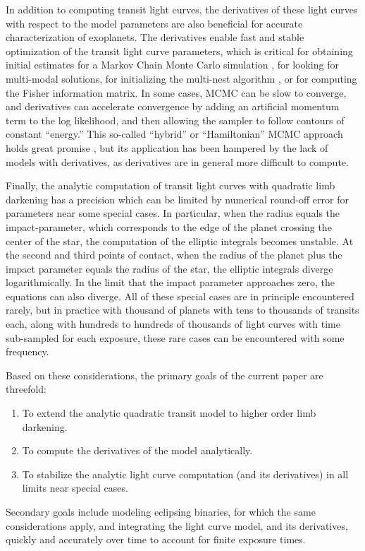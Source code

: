 \documentclass[modern,trackchanges]{aastex63}
\begin{document}
In addition to computing transit light curves, the derivatives of these light
curves with respect to the model parameters are also beneficial for accurate
characterization of exoplanets.   The derivatives enable fast and stable
optimization of the transit light curve parameters, which is critical for
obtaining initial estimates for a Markov Chain Monte Carlo simulation
\citep[MCMC; e.g.][]{Ford2005,Ford2006},
for looking for multi-modal solutions, for initializing the multi-nest
algorithm \citep{Feroz2008}, or for computing the Fisher information matrix.
In some cases, MCMC can be slow to converge, and derivatives can accelerate
convergence by adding an artificial momentum term to the log likelihood,
and then allowing the sampler to follow contours of constant ``energy.''
This so-called ``hybrid'' or ``Hamiltonian'' MCMC approach holds great promise \citep{Neal2011,Girolami2011,Betancourt2017},
but its application has been hampered by the lack of models with derivatives,
as derivatives are in general more difficult to compute.

Finally, the analytic computation of transit light curves with quadratic
limb darkening has a precision which can be limited by numerical round-off
error for parameters near some special cases.  In
particular, when the radius equals the impact-parameter, which corresponds to
the edge of the planet crossing the center of the star, the computation of the
elliptic integrals becomes unstable.  At the second and third points of
contact, when the radius of the planet plus the impact parameter equals
the radius of the star, the elliptic integrals diverge logarithmically.  In the
limit that the impact parameter approaches zero, the equations can also
diverge.  All of these special cases are in principle encountered rarely,
but in practice with thousand of planets with tens to thousands of
transits each, along with hundreds to hundreds of thousands of light
curves with time sub-sampled for each exposure, these rare cases can
be encountered with some frequency.

Based on these considerations, the primary goals of the current paper are
threefold:
\begin{enumerate}
\item To extend the analytic quadratic transit model to higher order limb darkening.
\item To compute the derivatives of the model analytically.
\item To stabilize the analytic light curve computation (and its derivatives)
in all limits near special cases.
\end{enumerate}
Secondary goals include modeling eclipsing binaries, for which the same
considerations apply, and integrating the light curve model, and its
derivatives, quickly and accurately over time to account for finite
exposure times.
\end{document}
